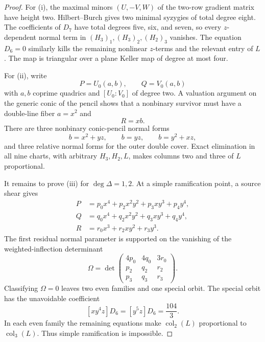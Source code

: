\begin{proof}
For (i), the maximal minors \((U,-V,W)\) of the two-row gradient matrix have
height two.  Hilbert--Burch gives two minimal syzygies of total degree
eight.  The coefficients of \(D_7\) have total degrees five, six, and seven,
so every \(z\)-dependent normal term in
\((H_3)_1,(H_3)_2,(H_2)_3\) vanishes.  The equation \(D_6=0\) similarly
kills the remaining nonlinear \(z\)-terms and the relevant entry of \(L\).
The map is triangular over a plane Keller map of degree at most four.

For (ii), write
\[
P=U_0(a,b),\qquad Q=V_0(a,b)
\]
with \(a,b\) coprime quadrics and \([U_0:V_0]\) of degree two.  A valuation
argument on the generic conic of the pencil shows that a nonbinary survivor
must have a double-line fiber \(a=x^2\) and
\[
R=xb.
\]
There are three nonbinary conic-pencil normal forms
\[
b=x^2+yz,\qquad b=yz,\qquad b=y^2+xz,
\]
and three relative normal forms for the outer double cover.  Exact
elimination in all nine charts, with arbitrary \(H_3,H_2,L\), makes columns
two and three of \(L\) proportional.

It remains to prove (iii) for \(\deg\Delta=1,2\).  At a simple
ramification point, a source shear gives
\[
\begin{aligned}
P&=p_0x^4+p_2x^2y^2+p_3xy^3+p_4y^4,\\
Q&=q_0x^4+q_2x^2y^2+q_3xy^3+q_4y^4,\\
R&=r_0x^3+r_2xy^2+r_3y^3.
\end{aligned}
\]
The first residual normal parameter is supported on the vanishing of the
weighted-inflection determinant
\[
\Omega=
\det\begin{pmatrix}
4p_0&4q_0&3r_0\\
p_2&q_2&r_2\\
p_3&q_3&r_3
\end{pmatrix}.
\]
Classifying \(\Omega=0\) leaves two even families and one special orbit.
The special orbit has the unavoidable coefficient
\[
[xy^4z]D_6=[y^5z]D_6=\frac{104}{3}.
\]
In each even family the remaining equations make
\(\operatorname{col}_2(L)\) proportional to
\(\operatorname{col}_3(L)\).  Thus simple ramification is impossible.


\end{proof}
